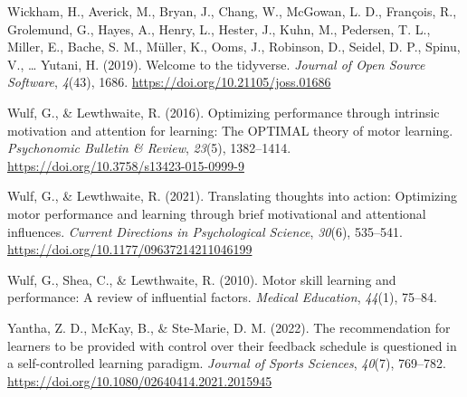 \documentclass[
  doc, donotrepeattitle,floatsintext]{apa7}
\newlength{\cslhangindent}
\newlength{\cslentryspacingunit} %
\newenvironment{CSLReferences}[2] %
 {%
  \setlength{\parindent}{0pt}
  \ifodd #1
  \let\oldpar\par
  \def\par{\hangindent=\cslhangindent\oldpar}
  \fi
  \setlength{\parskip}{#2\cslentryspacingunit}
 }%
 {}
\begin{document}
\begin{CSLReferences}{1}{0}
\leavevmode{}%
Wickham, H., Averick, M., Bryan, J., Chang, W., McGowan, L. D., François, R., Grolemund, G., Hayes, A., Henry, L., Hester, J., Kuhn, M., Pedersen, T. L., Miller, E., Bache, S. M., Müller, K., Ooms, J., Robinson, D., Seidel, D. P., Spinu, V., \ldots{} Yutani, H. (2019). Welcome to the {tidyverse}. \emph{Journal of Open Source Software}, \emph{4}(43), 1686. \url{https://doi.org/10.21105/joss.01686}

\leavevmode{}%
Wulf, G., \& Lewthwaite, R. (2016). Optimizing performance through intrinsic motivation and attention for learning: {The OPTIMAL} theory of motor learning. \emph{Psychonomic Bulletin \& Review}, \emph{23}(5), 1382--1414. \url{https://doi.org/10.3758/s13423-015-0999-9}

\leavevmode{}%
Wulf, G., \& Lewthwaite, R. (2021). Translating thoughts into action: Optimizing motor performance and learning through brief motivational and attentional influences. \emph{Current Directions in Psychological Science}, \emph{30}(6), 535--541. \url{https://doi.org/10.1177/09637214211046199}

\leavevmode{}%
Wulf, G., Shea, C., \& Lewthwaite, R. (2010). Motor skill learning and performance: A review of influential factors. \emph{Medical Education}, \emph{44}(1), 75--84.

\leavevmode{}%
Yantha, Z. D., McKay, B., \& Ste-Marie, D. M. (2022). The recommendation for learners to be provided with control over their feedback schedule is questioned in a self-controlled learning paradigm. \emph{Journal of Sports Sciences}, \emph{40}(7), 769--782. \url{https://doi.org/10.1080/02640414.2021.2015945}

\end{CSLReferences}
\end{document}
